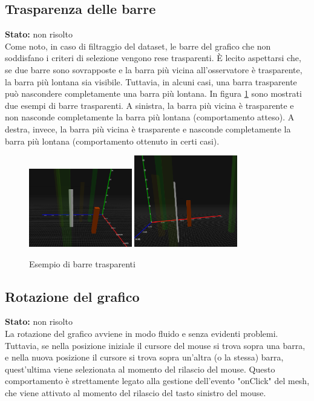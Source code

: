 \subsection{Trasparenza delle barre}
\textbf{Stato:} non risolto\\
Come noto, in caso di filtraggio del dataset, le barre del grafico
che non soddisfano i criteri di selezione vengono rese trasparenti.
È lecito aspettarsi che, se due barre sono sovrapposte e la barra più vicina all'osservatore
è trasparente, la barra più lontana sia visibile. Tuttavia, in alcuni casi,
una barra trasparente può nascondere completamente una barra più lontana.
In figura \ref{fig:trasparenza} sono mostrati due esempi di barre trasparenti.
A sinistra, la barra più vicina è trasparente e non nasconde
completamente la barra più lontana (comportamento atteso). A destra, invece,
la barra più vicina è trasparente e nasconde completamente la barra 
più lontana (comportamento ottenuto in certi casi).
\begin{figure}[h!]
    \centering
    \includegraphics[width=0.4\textwidth]{template/images/barreok.png}
    \hspace{0.5cm}
    \includegraphics[width=0.4\textwidth]{template/images/barre.png}
    \caption{Esempio di barre trasparenti}
    \label{fig:trasparenza}
\end{figure}

\subsection{Rotazione del grafico}
\textbf{Stato:} non risolto\\
La rotazione del grafico avviene in modo fluido e senza evidenti problemi. Tuttavia,
se nella posizione iniziale il cursore del mouse si trova sopra una barra, e
nella nuova posizione il cursore si trova sopra un'altra (o la stessa) barra,
quest'ultima viene selezionata al momento del rilascio del mouse.
Questo comportamento è strettamente legato alla
gestione dell'evento "onClick" del mesh, che viene attivato al momento del rilascio del tasto sinistro del mouse.
